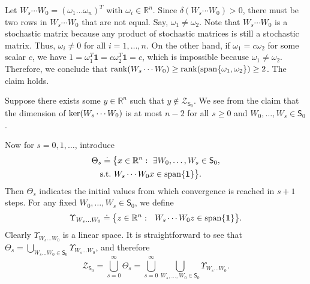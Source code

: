 \documentclass[a4paper, 11pt]{article}
\begin{document}
Let $W_s\cdots W_0=(\omega_1 \dots \omega_n)^T$ with $\omega_i\in\mathbb{R}^n$. Since $\delta(W_s\cdots W_0)>0$, there must be two  rows in $W_s\cdots W_0$ that are not equal. Say,    $\omega_1\neq \omega_2$. Note that $W_s\cdots W_0$ is a stochastic matrix because any product of stochastic matrices is still a stochastic matrix. Thus, $\omega_i\neq 0$ for all $i=1,\dots,n$. On the other hand, if $\omega_1=c\omega_2$ for some scalar $c$, we have $1=\omega_1^T \mathbf{1}=c\omega_2^T \mathbf{1}=c$, which is impossible because $\omega_1\neq \omega_2$. Therefore, we conclude that ${\rm rank}(W_s\cdots W_0)\geq {\rm rank}({\rm span} \{\omega_1,\omega_2\})\geq2$.  The claim holds.

\vspace{2mm}
Suppose there exists some $y\in \mathbb{R}^n$ such that $y\notin \mathscr{Z}_{\mathsf{S}_0}$. We see from the claim that the dimension of  ${\rm ker}(W_s\cdots W_0)$ is at most $n-2$ for all $s\geq0$ and $W_0,\dots,W_s\in \mathsf{S}_0$.

 Now  for $s=0,1,\dots$, introduce
\begin{align*}
& \Theta_s\doteq\big\{x  \in\mathbb{R}^n:\  \exists W_0 ,\dots,W_s\in \mathsf{S}_0, \nonumber\\
&\ \ \ {\rm s.t.} \ W_s \cdots W_0  x  \in {\rm span}\{\mathbf{1}\}\big\}.
\end{align*}
Then $\Theta_s$ indicates the initial values  from which convergence is reached in $s+1$ steps. For any fixed $W_0,\dots,W_s\in\mathsf{S}_0$, we define
$$
\Upsilon_{W_s\dots W_0} \doteq \big\{z\in\mathbb{R}^n:\  \ W_s \cdots W_0  z\in {\rm span}\{\mathbf{1}\}\big\}.
$$
 Clearly $\Upsilon_{W_s\dots W_0}$ is a linear space. It is straightforward to see that $\Theta_s=\bigcup_{W_s\dots W_0\in \mathsf{S}_0} \Upsilon_{W_s\dots W_0}$, and therefore
 $$
  \mathscr{Z}_{\mathsf{S}_0}=\bigcup_{s=0}^\infty \Theta_s=\bigcup_{s=0}^\infty \bigcup_{W_s,\dots, W_0\in \mathsf{S}_0} \Upsilon_{W_s\dots W_0}.
  $$
\end{document}

